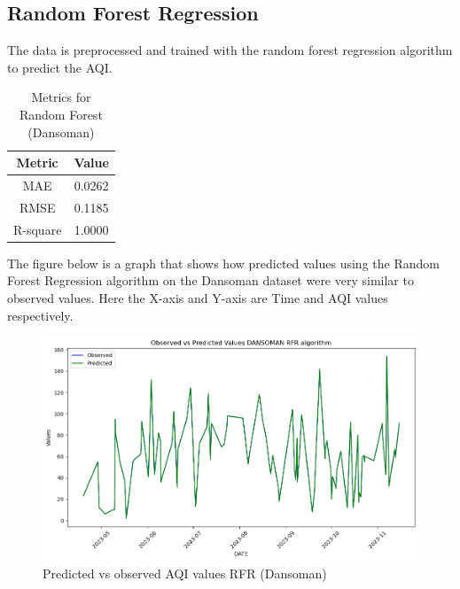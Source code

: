\documentclass{book}
\numberwithin{equation}{section}
\numberwithin{figure}{section}
\begin{document}
\subsection{Random Forest Regression} 
The data is preprocessed and trained with the random forest regression algorithm to predict the AQI.
\begin{table}[H]
    \centering
    \begin{tabular}{|c|c|}
        \hline
        \textbf{Metric} & \textbf{Value} \\
        \hline
        MAE & 0.0262 \\
        \hline
        RMSE & 0.1185\\
        \hline
        R-square & 1.0000 \\
        \hline
    \end{tabular}
    \caption{Metrics for Random Forest  (Dansoman)}
    \label{tab: RFR metrics(Dansoman)}
\end{table}
The figure below is a graph that shows how predicted values using the Random Forest Regression algorithm on the Dansoman dataset were very similar to observed values. Here the X-axis and Y-axis are Time and AQI values respectively.
\begin{figure}[H]
 \centering
        \includegraphics[width=\linewidth]{RFR line plot.png}
        \caption{ Predicted vs observed AQI values RFR (Dansoman)}
        \label{fig: RFR Predicted vs observed AQI(Dansoman)}
\end{figure}
\end{document}
